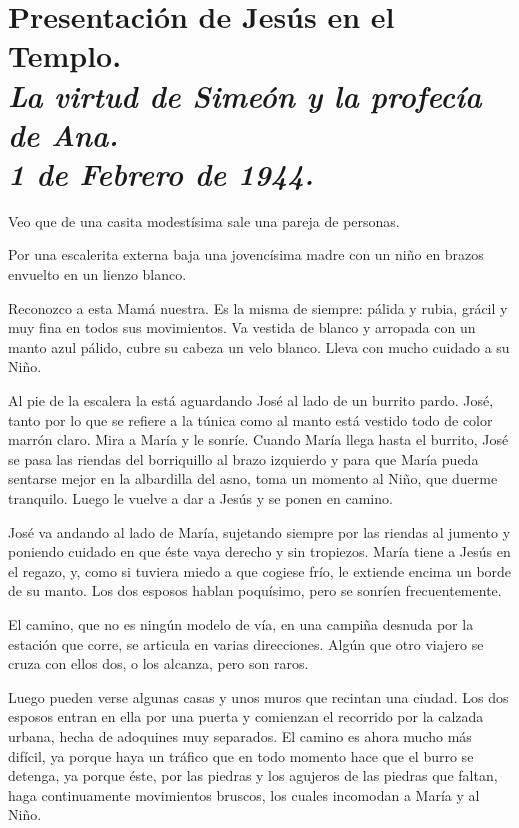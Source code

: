 \documentclass[12pt]{book} %
\begin{document}
\chapter*{Presentación de Jesús en el Templo. \\ \normalfont\normalsize\textit{La virtud de Simeón y la profecía de Ana. \\ 1 de Febrero de 1944.}}

Veo que de una casita modestísima sale una pareja de personas. 

Por una escalerita externa baja una jovencísima madre con un niño en brazos envuelto en un lienzo blanco. 

Reconozco a esta Mamá nuestra. Es la misma de siempre: pálida y rubia, grácil y muy fina en todos sus movimientos. Va vestida de blanco y arropada con un manto azul pálido, cubre su cabeza un velo blanco. Lleva con mucho cuidado a su Niño. 

Al pie de la escalera la está aguardando José al lado de un burrito pardo. José, tanto por lo que se refiere a la túnica como al manto está vestido todo de color marrón claro. Mira a María y le sonríe. Cuando María llega hasta el burrito, José se pasa las riendas del borriquillo al brazo izquierdo y para que María pueda sentarse mejor en la albardilla del asno, toma un momento al Niño, que duerme tranquilo. Luego le vuelve a dar a Jesús y se ponen en camino. 

José va andando al lado de María, sujetando siempre por las riendas al jumento y poniendo cuidado en que éste vaya derecho y sin tropiezos. María tiene a Jesús en el regazo, y, como si tuviera miedo a que cogiese frío, le extiende encima un borde de su manto. Los dos esposos hablan poquísimo, pero se sonríen frecuentemente. 

El camino, que no es ningún modelo de vía, en una campiña desnuda por la estación que corre, se articula en varias direcciones. Algún que otro viajero se cruza con ellos dos, o los alcanza, pero son raros. 

Luego pueden verse algunas casas y unos muros que recintan una ciudad. Los dos esposos entran en ella por una puerta y comienzan el recorrido por la calzada urbana, hecha de adoquines muy separados. El camino es ahora mucho más difícil, ya porque haya un tráfico que en todo momento hace que el burro se detenga, ya porque éste, por las piedras y los agujeros de las piedras que faltan, haga continuamente movimientos bruscos, los cuales incomodan a María y al Niño. 
\end{document}
